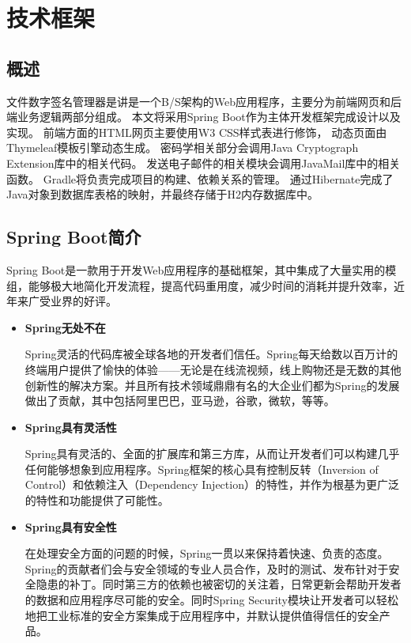 
\chapter{技术框架}

\section{概述}

文件数字签名管理器是讲是一个B/S架构的Web应用程序，主要分为前端网页和后端业务逻辑两部分组成。
本文将采用Spring Boot\cite{springboot}作为主体开发框架完成设计以及实现。
前端方面的HTML网页主要使用W3 CSS\cite{w3css}样式表进行修饰，
动态页面由Thymeleaf\cite{thymeleaf}模板引擎动态生成。
密码学相关部分会调用Java Cryptograph Extension\cite{jce}库中的相关代码。
发送电子邮件的相关模块会调用JavaMail\cite{javamail}库中的相关函数。
Gradle\cite{gradle}将负责完成项目的构建、依赖关系的管理。
通过Hibernate\cite{hibernate}完成了Java对象到数据库表格的映射，并最终存储于H2\cite{h2}内存数据库中。


\section{Spring Boot简介}

Spring Boot是一款用于开发Web应用程序的基础框架，其中集成了大量实用的模组，能够极大地简化开发流程，提高代码重用度，减少时间的消耗并提升效率，近年来广受业界的好评。

\begin{itemize}
	\item \textbf{Spring无处不在}
	
	Spring灵活的代码库被全球各地的开发者们信任。Spring每天给数以百万计的终端用户提供了愉快的体验——无论是在线流视频，线上购物还是无数的其他创新性的解决方案。并且所有技术领域鼎鼎有名的大企业们都为Spring的发展做出了贡献，其中包括阿里巴巴，亚马逊，谷歌，微软，等等。
	
	\item \textbf{Spring具有灵活性}
	
	Spring具有灵活的、全面的扩展库和第三方库，从而让开发者们可以构建几乎任何能够想象到应用程序。Spring框架的核心具有控制反转（Inversion of Control）和依赖注入（Dependency Injection）的特性，并作为根基为更广泛的特性和功能提供了可能性。
	
	\item \textbf{Spring具有安全性}
	
	在处理安全方面的问题的时候，Spring一贯以来保持着快速、负责的态度。Spring的贡献者们会与安全领域的专业人员合作，及时的测试、发布针对于安全隐患的补丁。同时第三方的依赖也被密切的关注着，日常更新会帮助开发者的数据和应用程序尽可能的安全。同时Spring Security模块让开发者可以轻松地把工业标准的安全方案集成于应用程序中，并默认提供值得信任的安全产品。
	
\end{itemize}

